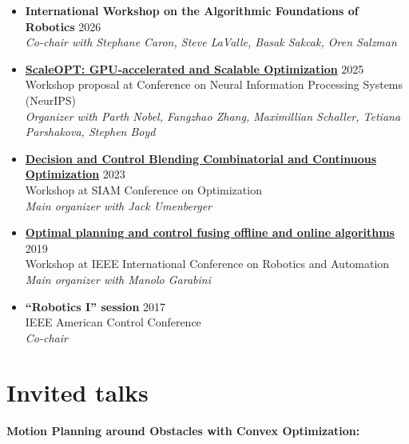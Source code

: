 \documentclass[11pt,a4paper,sans]{moderncv}
\begin{document}
\begin{itemize}
	
\item \textbf{International Workshop on the Algorithmic Foundations of Robotics} \hfill 2026 \\
\emph{Co-chair with Stephane Caron, Steve LaValle,  Basak Sakcak, Oren Salzman}

\item \href{https://www.cvxgrp.org/scaleopt/}{\color{cyan}\textbf{ScaleOPT: GPU-accelerated and Scalable Optimization}} \hfill 2025 \\
Workshop proposal at Conference on Neural Information Processing Systems (NeurIPS) \\
\emph{Organizer with Parth Nobel, Fangzhao Zhang, Maximillian Schaller, Tetiana Parshakova, Stephen Boyd}

\item \href{https://meetings.siam.org/sess/dsp_programsess.cfm?SESSIONCODE=76788}{\color{cyan}\textbf{Decision and Control Blending Combinatorial and Continuous Optimization}} \hfill 2023 \\
Workshop at SIAM Conference on Optimization \\
\emph{Main organizer with Jack Umenberger}

\item \href{https://sites.google.com/mit.edu/icra19ws}{\color{cyan}\textbf{Optimal planning and control fusing offline and online algorithms}} \hfill 2019 \\
Workshop at IEEE International Conference on Robotics and Automation \\
\emph{Main organizer with Manolo Garabini}

\item \textbf{``Robotics I'' session} \hfill 2017 \\
IEEE American Control Conference \\
\emph{Co-chair}

\end{itemize}


\section{Invited talks}

\vspace{5pt}

\textbf{Motion Planning around Obstacles with Convex Optimization:}

\vspace{5pt}
\end{document}

